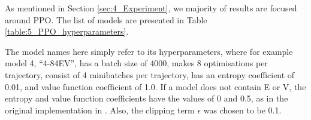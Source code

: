 As mentioned in Section \ref{sec:4_Experiment}, we majority of results are focused around PPO. The list of models are presented in Table \ref{table:5_PPO_hyperparameters}.
\begin{table}[hbt]
    \centering
    \caption{The different PPO models tested, along with their hyperparameters.}
    \label{table:5_PPO_hyperparameters}
\end{table}
The model names here simply refer to its hyperparameters, where for example model 4, ``4-84EV'', has a batch size of 4000, makes 8 optimisations per trajectory, consist of 4 minibatches per trajectory, has an entropy coefficient of 0.01, and value function coefficient of 1.0. If a model does not contain E or V, the entropy and value function coefficients have the values of 0 and 0.5, as in the original implementation in \cite{baselines}. Also, the clipping term $\epsilon$ was chosen to be 0.1.

